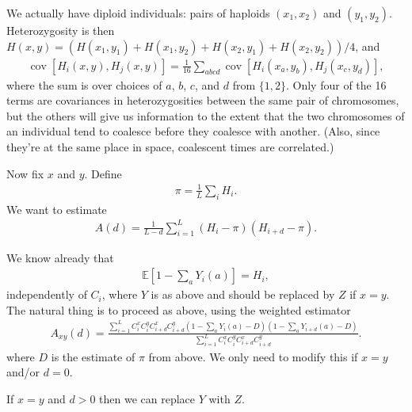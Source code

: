\documentclass{article}
\newcommand{\E}{\mathbb{E}}
\DeclareMathOperator{\cov}{cov}
\begin{document}
We actually have diploid individuals: pairs of haploids $(x_1,x_2)$ and $(y_1,y_2)$.
Heterozygosity is then $H(x,y) = (H(x_1,y_1)+H(x_1,y_2)+H(x_2,y_1)+H(x_2,y_2))/4$,
and 
\begin{align}
    \cov[H_i(x,y), H_j(x,y)] = \frac{1}{16} \sum_{abcd} \cov[H_i(x_a,y_b),H_j(x_c,y_d)],
\end{align}
where the sum is over choices of $a$, $b$, $c$, and $d$ from $\{1,2\}$.
Only four of the 16 terms are covariances in heterozygosities
between the same pair of chromosomes,
but the others will give us information to the extent that
the two chromosomes of an individual tend to coalesce before they coalesce with another.
(Also, since they're at the same place in space, coalescent times are correlated.)

Now fix $x$ and $y$.
Define
\begin{align}
    \pi = \frac{1}{L} \sum_i H_i .
\end{align}
We want to estimate
\begin{align}
    A(d) = \frac{1}{L-d} \sum_{i=1}^L (H_{i}-\pi)(H_{i+d}-\pi) .
\end{align}

We know already that
\begin{align}
    \E\left[ 1 - \sum_a Y_i(a) \right] = H_i ,
\end{align}
independently of $C_i$,
where $Y$ is as above and should be replaced by $Z$ if $x=y$.
The natural thing is to proceed as above,
using the weighted estimator
\begin{align}
    A_{xy}(d) = \frac{ \sum_{i=1}^L C_i^x C_i^y C_{i+d}^x C_{i+d}^y (1-\sum_a Y_i(a)-D)(1-\sum_a Y_{i+d}(a)-D)  }{\sum_{i=1}^L C_i^x C_i^y C_{i+d}^x C_{i+d}^y }. 
\end{align}
where $D$ is the estimate of $\pi$ from above.
We only need to modify this if $x=y$ and/or $d=0$.

If $x=y$ and $d>0$ then we can replace $Y$ with $Z$.
\end{document}
